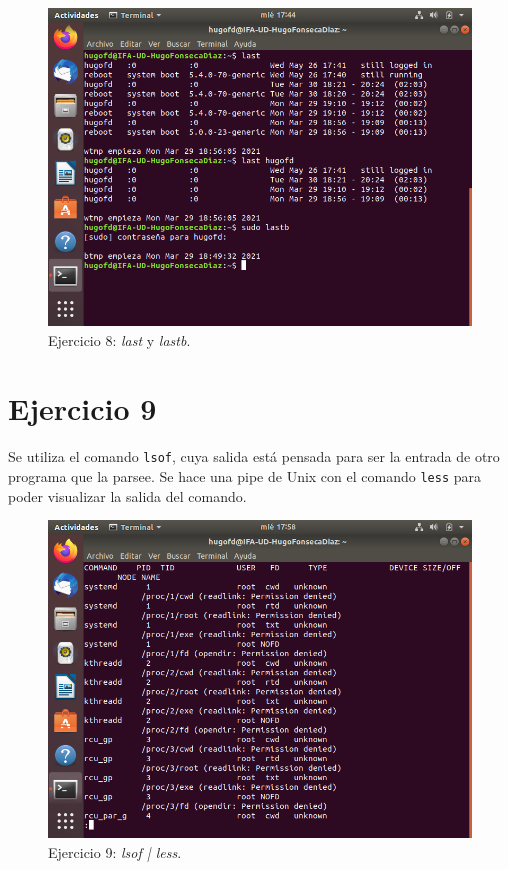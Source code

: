 \documentclass[11pt]{article}
\begin{document}
\begin{figure}[H]
    \caption{Ejercicio 8: \textit{last} y \textit{lastb}.}
  \centering
  \includegraphics{e8.png}
\end{figure}

\section{Ejercicio 9}
Se utiliza el comando \verb|lsof|, cuya salida está pensada para ser la entrada de otro programa que la parsee. Se hace una pipe de Unix con el comando \verb|less| para poder visualizar la salida del comando.

\begin{figure}[H]
    \caption{Ejercicio 9: \textit{lsof | less}.}
  \centering
  \includegraphics{e9.png}
\end{figure}

\begin{thebibliography}{8}
\end{thebibliography}
\end{document}
